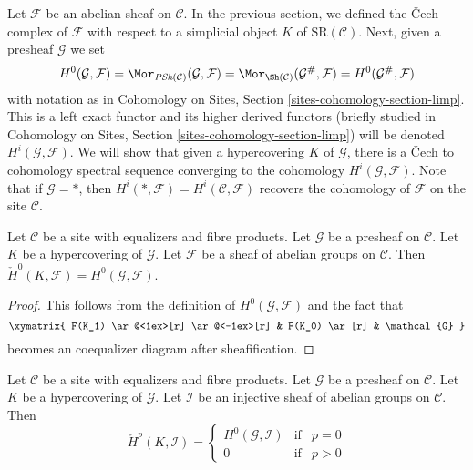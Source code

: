\medskip\noindent
Let $\mathcal{F}$ be an abelian sheaf on $\mathcal{C}$.
In the previous section, we defined the {\v C}ech complex of $\mathcal{F}$
with respect to a simplicial object $K$ of $\text{SR}(\mathcal{C})$.
Next, given a presheaf $\mathcal{G}$ we set
$$
H^0(\mathcal{G}, \mathcal{F}) =
\Mor_{\textit{PSh}(\mathcal{C})}(\mathcal{G}, \mathcal{F}) =
\Mor_{\Sh(\mathcal{C})}(\mathcal{G}^\#, \mathcal{F}) =
H^0(\mathcal{G}^\#, \mathcal{F})
$$
with notation as in
Cohomology on Sites, Section \ref{sites-cohomology-section-limp}.
This is a left exact functor and its higher derived functors
(briefly studied in
Cohomology on Sites, Section \ref{sites-cohomology-section-limp})
will be denoted $H^i(\mathcal{G}, \mathcal{F})$.
We will show that given a hypercovering $K$ of $\mathcal{G}$,
there is a {\v C}ech to cohomology spectral sequence converging to the
cohomology $H^i(\mathcal{G}, \mathcal{F})$.
Note that if $\mathcal{G} = *$, then
$H^i(*, \mathcal{F}) = H^i(\mathcal{C}, \mathcal{F})$ recovers
the cohomology of $\mathcal{F}$ on the site $\mathcal{C}$.

\begin{lemma}
\label{lemma-h0-cech-variant}
Let $\mathcal{C}$ be a site with equalizers and fibre products.
Let $\mathcal{G}$ be a presheaf on $\mathcal{C}$.
Let $K$ be a hypercovering of $\mathcal{G}$.
Let $\mathcal{F}$ be a sheaf of abelian groups on $\mathcal{C}$.
Then $\check{H}^0(K, \mathcal{F}) = H^0(\mathcal{G}, \mathcal{F})$.
\end{lemma}

\begin{proof}
This follows from the definition of $H^0(\mathcal{G}, \mathcal{F})$
and the fact that
$$
\xymatrix{
F(K_1) \ar@<1ex>[r] \ar@<-1ex>[r] &
F(K_0) \ar[r] & \mathcal{G}
}
$$
becomes an coequalizer diagram after sheafification.
\end{proof}

\begin{lemma}
\label{lemma-injective-trivial-cech-variant}
Let $\mathcal{C}$ be a site with equalizers and fibre products.
Let $\mathcal{G}$ be a presheaf on $\mathcal{C}$.
Let $K$ be a hypercovering of $\mathcal{G}$.
Let $\mathcal{I}$ be an injective sheaf of abelian groups on $\mathcal{C}$.
Then
$$
\check{H}^p(K, \mathcal{I}) =
\left\{
\begin{matrix}
H^0(\mathcal{G}, \mathcal{I}) & \text{if} & p = 0 \\
0 & \text{if} & p > 0
\end{matrix}
\right.
$$
\end{lemma}


